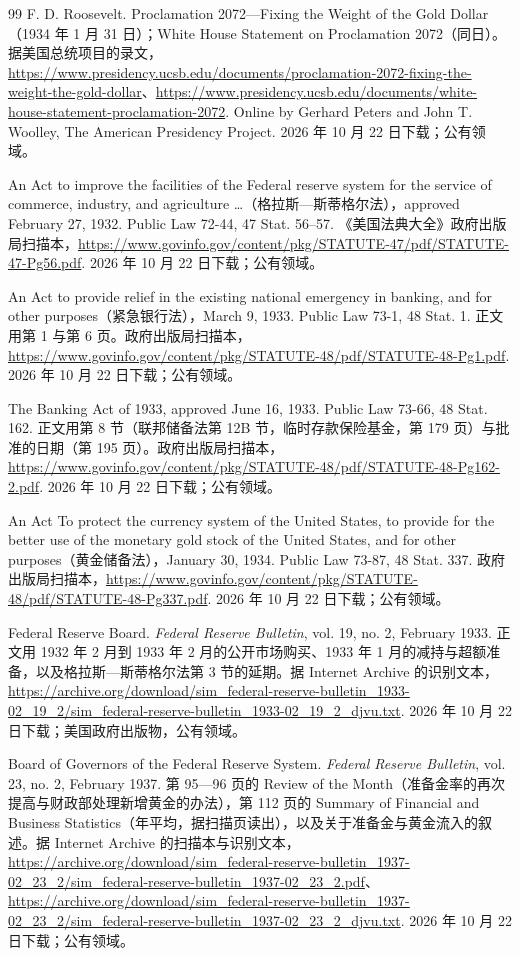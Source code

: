 \begin{thebibliography}{99}
 F. D. Roosevelt. Proclamation 2072---Fixing the Weight of the Gold Dollar（1934 年 1 月 31 日）；White House Statement on Proclamation 2072（同日）。据美国总统项目的录文，\url{https://www.presidency.ucsb.edu/documents/proclamation-2072-fixing-the-weight-the-gold-dollar}、\url{https://www.presidency.ucsb.edu/documents/white-house-statement-proclamation-2072}. Online by Gerhard Peters and John T. Woolley, The American Presidency Project. 2026 年 10 月 22 日下载；公有领域。

 An Act to improve the facilities of the Federal reserve system for the service of commerce, industry, and agriculture \ldots（格拉斯—斯蒂格尔法），approved February 27, 1932. Public Law 72-44, 47 Stat. 56--57. 《美国法典大全》政府出版局扫描本，\url{https://www.govinfo.gov/content/pkg/STATUTE-47/pdf/STATUTE-47-Pg56.pdf}. 2026 年 10 月 22 日下载；公有领域。

 An Act to provide relief in the existing national emergency in banking, and for other purposes（紧急银行法），March 9, 1933. Public Law 73-1, 48 Stat. 1. 正文用第 1 与第 6 页。政府出版局扫描本，\url{https://www.govinfo.gov/content/pkg/STATUTE-48/pdf/STATUTE-48-Pg1.pdf}. 2026 年 10 月 22 日下载；公有领域。

 The Banking Act of 1933, approved June 16, 1933. Public Law 73-66, 48 Stat. 162. 正文用第 8 节（联邦储备法第 12B 节，临时存款保险基金，第 179 页）与批准的日期（第 195 页）。政府出版局扫描本，\url{https://www.govinfo.gov/content/pkg/STATUTE-48/pdf/STATUTE-48-Pg162-2.pdf}. 2026 年 10 月 22 日下载；公有领域。

 An Act To protect the currency system of the United States, to provide for the better use of the monetary gold stock of the United States, and for other purposes（黄金储备法），January 30, 1934. Public Law 73-87, 48 Stat. 337. 政府出版局扫描本，\url{https://www.govinfo.gov/content/pkg/STATUTE-48/pdf/STATUTE-48-Pg337.pdf}. 2026 年 10 月 22 日下载；公有领域。

 Federal Reserve Board. \emph{Federal Reserve Bulletin}, vol. 19, no. 2, February 1933. 正文用 1932 年 2 月到 1933 年 2 月的公开市场购买、1933 年 1 月的减持与超额准备，以及格拉斯—斯蒂格尔法第 3 节的延期。据 Internet Archive 的识别文本，\url{https://archive.org/download/sim_federal-reserve-bulletin_1933-02_19_2/sim_federal-reserve-bulletin_1933-02_19_2_djvu.txt}. 2026 年 10 月 22 日下载；美国政府出版物，公有领域。

 Board of Governors of the Federal Reserve System. \emph{Federal Reserve Bulletin}, vol. 23, no. 2, February 1937. 第 95—96 页的 Review of the Month（准备金率的再次提高与财政部处理新增黄金的办法），第 112 页的 Summary of Financial and Business Statistics（年平均，据扫描页读出），以及关于准备金与黄金流入的叙述。据 Internet Archive 的扫描本与识别文本，\url{https://archive.org/download/sim_federal-reserve-bulletin_1937-02_23_2/sim_federal-reserve-bulletin_1937-02_23_2.pdf}、\url{https://archive.org/download/sim_federal-reserve-bulletin_1937-02_23_2/sim_federal-reserve-bulletin_1937-02_23_2_djvu.txt}. 2026 年 10 月 22 日下载；公有领域。


\end{thebibliography}
